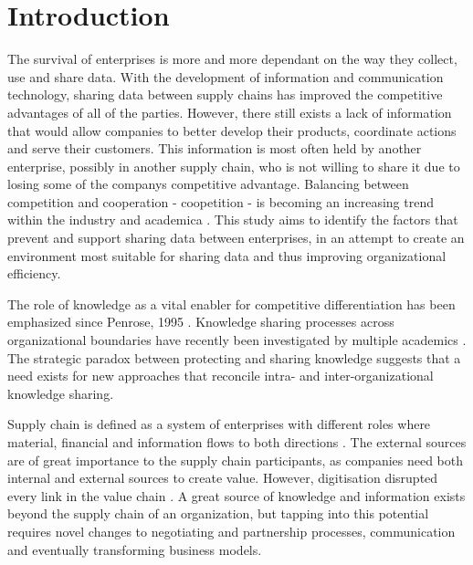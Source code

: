 \chapter{Introduction}
\label{chapter:intro}

The survival of enterprises is more and more dependant on the way they collect, use and share data. With the development of information and communication technology, sharing data between supply chains has improved the competitive advantages of all of the parties. However, there still exists a lack of information that would allow companies to better develop their products, coordinate actions and serve their customers. This information is most often held by another enterprise, possibly in another supply chain, who is not willing to share it due to losing some of the companys competitive advantage. Balancing between competition and cooperation - coopetition - is becoming an increasing trend within the industry and academica \cite{}. This study aims to identify the factors that prevent and support sharing data between enterprises, in an attempt to create an environment most suitable for sharing data and thus improving organizational efficiency.

The role of knowledge as a vital enabler for competitive differentiation has been emphasized since Penrose, 1995 \cite{penrose1995theory}. Knowledge sharing processes across organizational boundaries have recently been investigated by multiple academics \cite{loebbecke2016managing, chiu2006understanding, loebecke1999co}. The strategic paradox between protecting and sharing knowledge suggests that a need exists for new approaches that reconcile intra- and inter-organizational knowledge sharing. 

Supply chain is defined as a system of enterprises with different roles where material, financial and information flows to both directions \cite{fiala2005information}. The external sources are of great importance to the supply chain participants, as companies need both internal and external sources to create value. However, digitisation disrupted every link in the value chain \cite{chesbrough2007business}. A great source of knowledge and information exists beyond the supply chain of an organization, but tapping into this potential requires novel changes to negotiating and partnership processes, communication and eventually transforming business models. 

